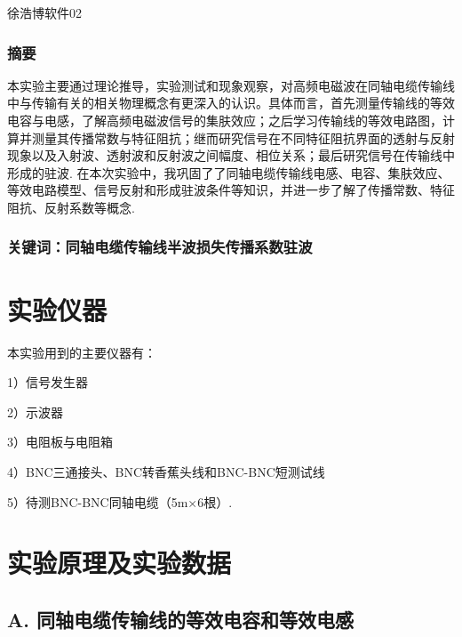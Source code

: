 \documentclass[UTF8]{ctexart}
\begin{document}
\renewcommand{\thefootnote}{\fnsymbol{footnote}}
\linespread{1.4}
\title{\vspace{-5em}\vspace{-2.5em}}
\date{}
\maketitle
\begin{center}
{\fangsong 徐浩博\quad 软件02}
\end{center}

\subsubsection*{摘要}
{\kaishu\normalsize   本实验主要通过理论推导，实验测试和现象观察，对高频电磁波在同轴电缆传输线中与传输有关的相关物理概念有更深入的认识。具体而言，首先测量传输线的等效电容与电感，了解高频电磁波信号的集肤效应；之后学习传输线的等效电路图，计算并测量其传播常数与特征阻抗；继而研究信号在不同特征阻抗界面的透射与反射现象以及入射波、透射波和反射波之间幅度、相位关系；最后研究信号在传输线中形成的驻波. 在本次实验中，我巩固了了同轴电缆传输线电感、电容、集肤效应、等效电路模型、信号反射和形成驻波条件等知识，并进一步了解了传播常数、特征阻抗、反射系数等概念.}
\subsubsection*{关键词：\quad 同轴电缆传输线  半波损失\quad  传播系数\quad 驻波\vspace{1.5em}}

\section{实验仪器}
本实验用到的主要仪器有：\par
1）信号发生器\par
2）示波器\par
3）电阻板与电阻箱\par
4）BNC三通接头、BNC转香蕉头线和BNC-BNC短测试线\par
5）待测BNC-BNC同轴电缆（5m×6根）.\par

\section{实验原理及实验数据}
\subsection*{ A. 同轴电缆传输线的等效电容和等效电感}
\end{document}
